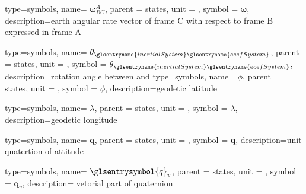 {type=symbols,
  name= \ensuremath{\boldsymbol{\omega}_{BC}^{A}},
  parent = {states},
  unit = \unexpanded{\si{\radian\per\second}},
  symbol = \ensuremath{\boldsymbol{\omega}},
  description={earth angular rate vector of frame C with respect to frame B expressed in frame A}
}

{type=symbols,
  name= \ensuremath{\theta_{\glsentryname{inertialSystem}\glsentryname{ecefSystem}}},
  parent = {states},
  unit = \unexpanded{\si{\radian\per\second}},
  symbol = \ensuremath{\theta_{\glsentryname{inertialSystem}\glsentryname{ecefSystem}}},
  description={rotation angle between  and }
}
{type=symbols,
  name= \ensuremath{\phi},
  parent = {states},
  unit = \unexpanded{\si{\radian}},
  symbol = \ensuremath{\phi},
  description={geodetic latitude}
}

{type=symbols,
  name= \ensuremath{\lambda},
  parent = {states},
  unit = \unexpanded{\si{\radian}},
  symbol = \ensuremath{\lambda},
  description={geodetic longitude}
}


{type=symbols,
  name= \ensuremath{\mathbf{q}},
  parent = {states},
  unit = \unexpanded{},
  symbol = \ensuremath{\mathbf{q}},
  description={unit quatertion of attitude}
}

{type=symbols,
  name= \ensuremath{\glsentrysymbol{q}_v},
  parent = {states},
  unit = {},
  symbol = \ensuremath{\mathbf{q}_v},
  description={ vetorial part of quaternion }
}

